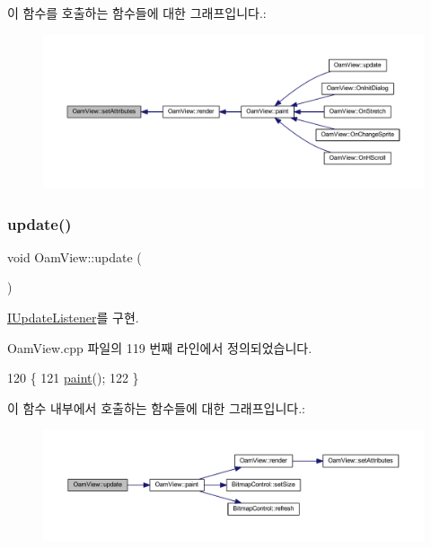 이 함수를 호출하는 함수들에 대한 그래프입니다.\+:
\nopagebreak
\begin{figure}[H]
\begin{center}
\leavevmode
\includegraphics[width=350pt]{class_oam_view_aafceb25b05d3ff2eacffa1a53308ee1d_icgraph}
\end{center}
\end{figure}
\mbox{\label{class_oam_view_a9a54cb2672c3302524a00b744d09b645}} 
\subsubsection{\texorpdfstring{update()}{update()}}
{\footnotesize\ttfamily void Oam\+View\+::update (\begin{DoxyParamCaption}{ }\end{DoxyParamCaption})\hspace{0.3cm}{\ttfamily [virtual]}}



\mbox{\hyperlink{class_i_update_listener_ac03b85f52e858d0bbd08a4984b2cb929}{I\+Update\+Listener}}를 구현.



Oam\+View.\+cpp 파일의 119 번째 라인에서 정의되었습니다.


\begin{DoxyCode}
120 \{
121   \mbox{\hyperlink{class_oam_view_af9092e04b559ef87670e18dd42c45669}{paint}}();
122 \}
\end{DoxyCode}
이 함수 내부에서 호출하는 함수들에 대한 그래프입니다.\+:
\nopagebreak
\begin{figure}[H]
\begin{center}
\leavevmode
\includegraphics[width=350pt]{class_oam_view_a9a54cb2672c3302524a00b744d09b645_cgraph}
\end{center}
\end{figure}
\mbox{\label{class_oam_view_ae51c17aebff73f557073546febb45eba}} 
